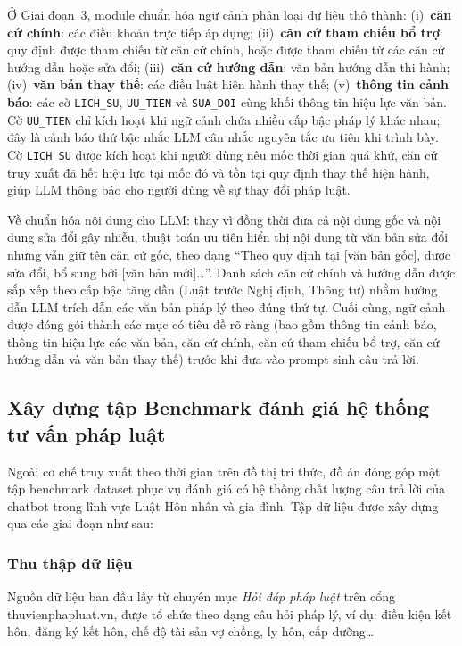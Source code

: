 \documentclass[../DoAn.tex]{subfiles}
\begin{document}
Ở Giai đoạn~3, module chuẩn hóa ngữ cảnh phân loại dữ liệu thô thành: (i)~\textbf{căn cứ chính}: các điều khoản trực tiếp áp dụng; (ii)~\textbf{căn cứ tham chiếu bổ trợ}: quy định được tham chiếu từ căn cứ chính, hoặc được tham chiếu từ các căn cứ hướng dẫn hoặc sửa đổi; (iii)~\textbf{căn cứ hướng dẫn}: văn bản hướng dẫn thi hành; (iv)~\textbf{văn bản thay thế}: các điều luật hiện hành thay thế; (v)~\textbf{thông tin cảnh báo}: các cờ \texttt{LICH\_SU}, \texttt{UU\_TIEN} và \texttt{SUA\_DOI} cùng khối thông tin hiệu lực văn bản. Cờ \texttt{UU\_TIEN} chỉ kích hoạt khi ngữ cảnh chứa nhiều cấp bậc pháp lý khác nhau; đây là cảnh báo thứ bậc nhắc LLM cân nhắc nguyên tắc ưu tiên khi trình bày. Cờ \texttt{LICH\_SU} được kích hoạt khi người dùng nêu mốc thời gian quá khứ, căn cứ truy xuất đã hết hiệu lực tại mốc đó và tồn tại quy định thay thế hiện hành, giúp LLM thông báo cho người dùng về sự thay đổi pháp luật.

Về chuẩn hóa nội dung cho LLM: thay vì đồng thời đưa cả nội dung gốc và nội dung sửa đổi gây nhiễu, thuật toán ưu tiên hiển thị nội dung từ văn bản sửa đổi nhưng vẫn giữ tên căn cứ gốc, theo dạng ``Theo quy định tại [văn bản gốc], được sửa đổi, bổ sung bởi [văn bản mới]\ldots''. Danh sách căn cứ chính và hướng dẫn được sắp xếp theo cấp bậc tăng dần (Luật trước Nghị định, Thông tư) nhằm hướng dẫn LLM trích dẫn các văn bản pháp lý theo đúng thứ tự. Cuối cùng, ngữ cảnh được đóng gói thành các mục có tiêu đề rõ ràng (bao gồm thông tin cảnh báo, thông tin hiệu lực các văn bản, căn cứ chính, căn cứ tham chiếu bổ trợ, căn cứ hướng dẫn và văn bản thay thế) trước khi đưa vào prompt sinh câu trả lời.

\subsection{Xây dựng tập Benchmark đánh giá hệ thống tư vấn pháp luật}
\label{subsection:benchmark}

Ngoài cơ chế truy xuất theo thời gian trên đồ thị tri thức, đồ án đóng góp một tập benchmark dataset phục vụ đánh giá có hệ thống chất lượng câu trả lời của chatbot trong lĩnh vực Luật Hôn nhân và gia đình. Tập dữ liệu được xây dựng qua các giai đoạn như sau:

\subsubsection{Thu thập dữ liệu}

Nguồn dữ liệu ban đầu lấy từ chuyên mục \textit{Hỏi đáp pháp luật} trên cổng thuvienphapluat.vn, được tổ chức theo dạng câu hỏi pháp lý, ví dụ: điều kiện kết hôn, đăng ký kết hôn, chế độ tài sản vợ chồng, ly hôn, cấp dưỡng\ldots
\end{document}
